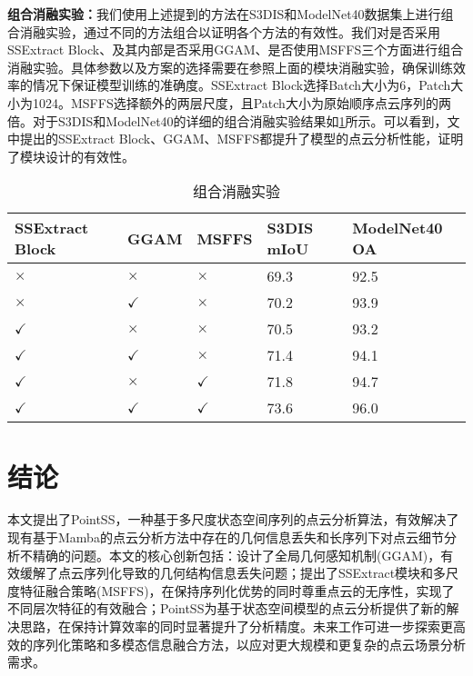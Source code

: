 \documentclass[preprint,12pt]{elsarticle}
\begin{document}
\textbf{组合消融实验：}我们使用上述提到的方法在S3DIS和ModelNet40数据集上进行组合消融实验，通过不同的方法组合以证明各个方法的有效性。我们对是否采用SSExtract Block、及其内部是否采用GGAM、是否使用MSFFS三个方面进行组合消融实验。具体参数以及方案的选择需要在参照上面的模块消融实验，确保训练效率的情况下保证模型训练的准确度。SSExtract Block选择Batch大小为6，Patch大小为1024。MSFFS选择额外的两层尺度，且Patch大小为原始顺序点云序列的两倍。对于S3DIS和ModelNet40的详细的组合消融实验结果如\cref{tab:combine}所示。可以看到，文中提出的SSExtract Block、GGAM、MSFFS都提升了模型的点云分析性能，证明了模块设计的有效性。
\begin{table}[htbp!]
	\centering
	\caption{组合消融实验}
	\label{tab:combine}
	\begin{tabular}{@{}lllll@{}}
		\toprule
		SSExtract Block & GGAM & MSFFS & S3DIS mIoU & ModelNet40 OA \\ 
		\midrule
		$\times$        & $\times$        & $\times$        & 69.3         & 92.5          \\
		$\times$        & $\checkmark$    & $\times$        & 70.2         & 93.9          \\
		$\checkmark$    & $\times$        & $\times$        & 70.5         & 93.2          \\
		$\checkmark$    & $\checkmark$    & $\times$        & 71.4         & 94.1          \\
		$\checkmark$    & $\times$        & $\checkmark$    & 71.8         & 94.7          \\
		$\checkmark$    & $\checkmark$    & $\checkmark$    & 73.6         & 96.0          \\ 
		\bottomrule
	\end{tabular}
\end{table}
\section{结论}
本文提出了PointSS，一种基于多尺度状态空间序列的点云分析算法，有效解决了现有基于Mamba的点云分析方法中存在的几何信息丢失和长序列下对点云细节分析不精确的问题。本文的核心创新包括：设计了全局几何感知机制(GGAM)，有效缓解了点云序列化导致的几何结构信息丢失问题；提出了SSExtract模块和多尺度特征融合策略(MSFFS)，在保持序列化优势的同时尊重点云的无序性，实现了不同层次特征的有效融合；PointSS为基于状态空间模型的点云分析提供了新的解决思路，在保持计算效率的同时显著提升了分析精度。未来工作可进一步探索更高效的序列化策略和多模态信息融合方法，以应对更大规模和更复杂的点云场景分析需求。
\end{document}
